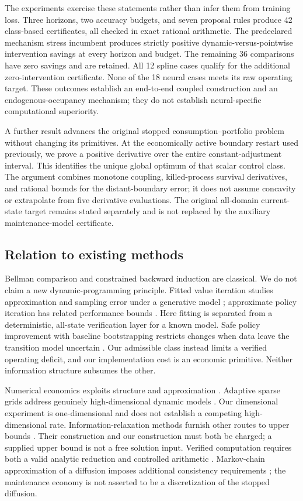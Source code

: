 The experiments exercise these statements rather than infer them from training loss. Three horizons, two accuracy budgets, and seven proposal rules produce 42 class-based certificates, all checked in exact rational arithmetic. The predeclared mechanism stress incumbent produces strictly positive dynamic-versus-pointwise intervention savings at every horizon and budget. The remaining 36 comparisons have zero savings and are retained. All 12 spline cases qualify for the additional zero-intervention certificate. None of the 18 neural cases meets its raw operating target. These outcomes establish an end-to-end coupled construction and an endogenous-occupancy mechanism; they do not establish neural-specific computational superiority.

A further result advances the original stopped consumption--portfolio problem without changing its primitives. At the economically active boundary restart used previously, we prove a positive derivative over the entire constant-adjustment interval. This identifies the unique global optimum of that scalar control class. The argument combines monotone coupling, killed-process survival derivatives, and rational bounds for the distant-boundary error; it does not assume concavity or extrapolate from five derivative evaluations. The original all-domain current-state target remains stated separately and is not replaced by the auxiliary maintenance-model certificate.

\subsection{Relation to existing methods}
Bellman comparison and constrained backward induction are classical. We do not claim a new dynamic-programming principle. Fitted value iteration studies approximation and sampling error under a generative model \citep{MunosSzepesvari2008}; approximate policy iteration has related performance bounds \citep{Scherrer2013}. Here fitting is separated from a deterministic, all-state verification layer for a known model. Safe policy improvement with baseline bootstrapping restricts changes when data leave the transition model uncertain \citep{Laroche2019}. Our admissible class instead limits a verified operating deficit, and our implementation cost is an economic primitive. Neither information structure subsumes the other.

Numerical economics exploits structure and approximation \citep{Judd1998}. Adaptive sparse grids address genuinely high-dimensional dynamic models \citep{BrummScheidegger2017}. Our dimensional experiment is one-dimensional and does not establish a competing high-dimensional rate. Information-relaxation methods furnish other routes to upper bounds \citep{BrownSmithSun2010,BrownSmith2014}. Their construction and our construction must both be charged; a supplied upper bound is not a free solution input. Verified computation requires both a valid analytic reduction and controlled arithmetic \citep{Rump2010}. Markov-chain approximation of a diffusion imposes additional consistency requirements \citep{KushnerDupuis2001}; the maintenance economy is not asserted to be a discretization of the stopped diffusion.

